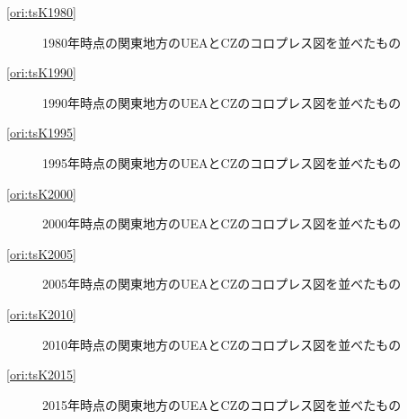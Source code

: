 \documentclass{ltjsarticle}
\begin{document}
\begin{itemize}
\begin{itemize}
\begin{description}
      \item[\ref{ori:tsK1980}] 1980年時点の関東地方のUEAとCZのコロプレス図を並べたもの
      \item[\ref{ori:tsK1990}] 1990年時点の関東地方のUEAとCZのコロプレス図を並べたもの
      \item[\ref{ori:tsK1995}] 1995年時点の関東地方のUEAとCZのコロプレス図を並べたもの
      \item[\ref{ori:tsK2000}] 2000年時点の関東地方のUEAとCZのコロプレス図を並べたもの
      \item[\ref{ori:tsK2005}] 2005年時点の関東地方のUEAとCZのコロプレス図を並べたもの
      \item[\ref{ori:tsK2010}] 2010年時点の関東地方のUEAとCZのコロプレス図を並べたもの
      \item[\ref{ori:tsK2015}] 2015年時点の関東地方のUEAとCZのコロプレス図を並べたもの
    \end{description}


\end{itemize}
\end{itemize}
\end{document}
